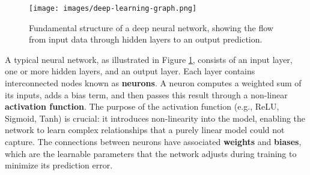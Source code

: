 \documentclass[12pt]{report}
\begin{document}
\begin{figure}[H]
    \centering
    \texttt{[image: images/deep-learning-graph.png]}
    \caption{Fundamental structure of a deep neural network, showing the flow from input data through hidden layers to an output prediction.}
    \label{fig:deep-learning-graph}
\end{figure}

A typical neural network, as illustrated in Figure \ref{fig:deep-learning-graph}, consists of an input layer, one or more hidden layers, and an output layer. Each layer contains interconnected nodes known as \textbf{neurons}. A neuron computes a weighted sum of its inputs, adds a bias term, and then passes this result through a non-linear \textbf{activation function}. The purpose of the activation function (e.g., ReLU, Sigmoid, Tanh) is crucial: it introduces non-linearity into the model, enabling the network to learn complex relationships that a purely linear model could not capture. The connections between neurons have associated \textbf{weights} and \textbf{biases}, which are the learnable parameters that the network adjusts during training to minimize its prediction error.
\end{document}
